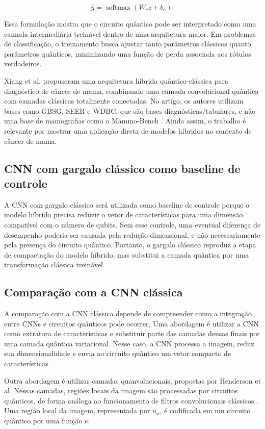 \documentclass[
    12pt,
    openright,
    oneside,
    a4paper,
    english,
    brazil
]{abntex2}
\begin{document}
\[
\hat{y}
=
\operatorname{softmax}(W_c z + b_c).
\]

Essa formulação mostra que o circuito quântico pode ser interpretado como uma camada intermediária treinável dentro de uma arquitetura maior. Em problemas de classificação, o treinamento busca ajustar tanto parâmetros clássicos quanto parâmetros quânticos, minimizando uma função de perda associada aos rótulos verdadeiros.

Xiang et al. propuseram uma arquitetura híbrida quântico-clássica para diagnóstico de câncer de mama, combinando uma camada convolucional quântica com camadas clássicas totalmente conectadas. No artigo, os autores utilizam bases como GBSG, SEER e WDBC, que são bases diagnósticas/tabulares, e não uma base de mamografias como o Mammo-Bench \cite{xiang2024qccnn}. Ainda assim, o trabalho é relevante por mostrar uma aplicação direta de modelos híbridos no contexto de câncer de mama.

\subsection{CNN com gargalo clássico como baseline de controle}
\label{subsec:cnn_gargalo_baseline}

A CNN com gargalo clássico será utilizada como baseline de controle porque o modelo híbrido precisa reduzir o vetor de características para uma dimensão compatível com o número de qubits. Sem esse controle, uma eventual diferença de desempenho poderia ser causada pela redução dimensional, e não necessariamente pela presença do circuito quântico. Portanto, o gargalo clássico reproduz a etapa de compactação do modelo híbrido, mas substitui a camada quântica por uma transformação clássica treinável.

\subsection{Comparação com a CNN clássica}
\label{subsec:comparacao_cnn_classica}

A comparação com a CNN clássica depende de compreender como a integração entre CNNs e circuitos quânticos pode ocorrer. Uma abordagem é utilizar a CNN como extratora de características e substituir parte das camadas densas finais por uma camada quântica variacional. Nesse caso, a CNN processa a imagem, reduz sua dimensionalidade e envia ao circuito quântico um vetor compacto de características.

Outra abordagem é utilizar camadas quanvolucionais, propostas por Henderson et al. Nessas camadas, regiões locais da imagem são processadas por circuitos quânticos, de forma análoga ao funcionamento de filtros convolucionais clássicos \cite{henderson2020quanvolutional}. Uma região local da imagem, representada por \(u_x\), é codificada em um circuito quântico por uma função \(e\):
\end{document}
